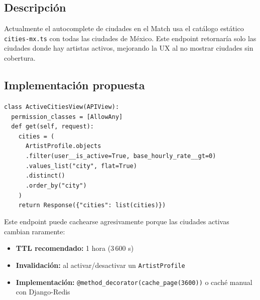 \documentclass[11pt,a4paper]{article}
\begin{document}
\subsection{Descripción}

Actualmente el autocomplete de ciudades en el Match usa el catálogo estático
\texttt{cities-mx.ts} con todas las ciudades de México. Este endpoint retornaría
solo las ciudades donde hay artistas activos, mejorando la UX al no mostrar
ciudades sin cobertura.

\subsection{Implementación propuesta}

\begin{tcolorbox}[codebox, title={Query del endpoint (backend/apps/quotes/views.py)}]
\texttt{class ActiveCitiesView(APIView):}\\
\texttt{\ \ permission\_classes = [AllowAny]}\\[4pt]
\texttt{\ \ def get(self, request):}\\
\texttt{\ \ \ \ cities = (}\\
\texttt{\ \ \ \ \ \ ArtistProfile.objects}\\
\texttt{\ \ \ \ \ \ .filter(user\_\_is\_active=True, base\_hourly\_rate\_\_gt=0)}\\
\texttt{\ \ \ \ \ \ .values\_list("city", flat=True)}\\
\texttt{\ \ \ \ \ \ .distinct()}\\
\texttt{\ \ \ \ \ \ .order\_by("city")}\\
\texttt{\ \ \ \ )}\\
\texttt{\ \ \ \ return Response(\{"cities": list(cities)\})}
\end{tcolorbox}

\begin{tcolorbox}[infobox, title={Estrategia de caché (Redis)}]
Este endpoint puede cachearse agresivamente porque las ciudades activas cambian
raramente:
\begin{itemize}[itemsep=3pt]
  \item \textbf{TTL recomendado:} 1 hora (3\,600 s)
  \item \textbf{Invalidación:} al activar/desactivar un \texttt{ArtistProfile}
  \item \textbf{Implementación:} \texttt{@method\_decorator(cache\_page(3600))} o caché manual con Django-Redis
\end{itemize}
\end{tcolorbox}
\end{document}
